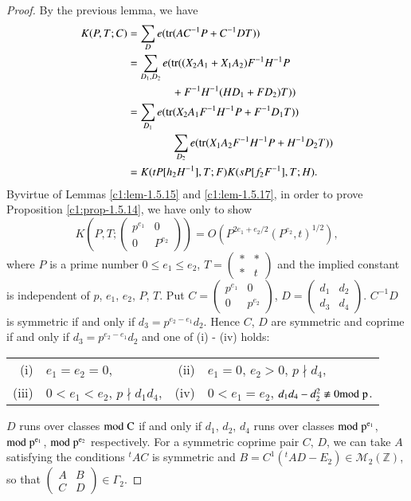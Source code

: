 \begin{proof}
By the previous lemma, we have
\begin{align*}
K(P,T;C)&= \sum_{D}e(\operatorname{tr}(AC^{-1}P+C^{-1}DT))\\
&=\sum_{D_{1},D_{2}}e(\operatorname{tr}((X_{2}A_{1}+X_{1}A_{2})F^{-1}H^{-1}P\\
&\qquad\qquad +F^{-1}H^{-1}(HD_{1}+FD_{2})T))\\
&=\sum_{D_{1}}e(\operatorname{tr}(X_{2}A_{1}F^{-1}H^{-1}P+F^{-1}D_{1}T))\\
&\qquad\qquad\sum_{D_{2}}e(\operatorname{tr}(X_{1}A_{2}F^{-1}H^{-1}P+H^{-1}D_{2}T))\\
&= K(tP[h_{2}H^{-1}], T;F)K(sP[f_{2}F^{-1}], T;H).
\end{align*}
By\pageoriginale virtue of Lemmas \ref{c1:lem-1.5.15} and
\ref{c1:lem-1.5.17}, in order to prove Proposition \ref{c1:prop-1.5.14}, we
have only to show
$$
K(P,T;
\begin{pmatrix}
p^{e_{1}} & 0\\
0 & P^{e_{2}}
\end{pmatrix}
)=O(P^{2e_{1}+e_{2}/2}(P^{e_{2}},t)^{1/2}),
$$
where $P$ is a prime number $0\leq e_{1}\leq e_{2}$,
$T=\left(\begin{smallmatrix} \ast & \ast\\ \ast & t
\end{smallmatrix}\right)$ and the implied constant is independent of
$p$, $e_{1}$, $e_{2}$, $P$, $T$. Put $C=\left(\begin{smallmatrix}
  p^{e_{1}} & 0\\ 0 & p^{e_{2}}
\end{smallmatrix}\right)$, $D=\left(\begin{smallmatrix} d_{1} &
  d_{2}\\ d_{3} & d_{4}\end{smallmatrix}\right)$. $C^{-1}D$ is
symmetric if and only if $d_{3}=p^{e_{2}-e_{1}}d_{2}$. Hence $C$, $D$
are symmetric and coprime if and only if $d_{3}=p^{e_{2}-e_{1}}d_{2}$
and one of (i) - (iv) holds:
\begin{center}
\begin{tabular}{r@{\;\,}lr@{\;\,}l}
(i) & $e_{1}=e_{2}=0$, & (ii) & $e_{1}=0$, $e_{2}>0$, $p\nmid
  d_{4}$,\\[4pt]
(iii) & $0<e_{1}<e_{2}$, $p\nmid d_{1}d_{4}$, & (iv) &
  $0<e_{1}=e_{2}$, $d_{1}d_{4}-d^{2}_{2}\not\equiv 0\rm{mod} \; p$.
\end{tabular}
\end{center}
$D$ runs over classes $\rm{mod} \; C$ if and only if $d_{1}$, $d_{2}$,
$d_{4}$ runs over classes $\rm{mod} \; p^{e_{1}}$, $\rm{mod} \; p^{e_{1}}$, $\rm{mod} \;
p^{e_{2}}$ respectively. For a symmetric coprime pair $C$, $D$, we can
take $A$ satisfying the conditions ${}^{t}AC$ is symmetric and
$B=C^{1}({}^{t}AD-E_{2})\in\mathscr{M}_{2}(\mathbb{Z})$, so that
$\left(\begin{smallmatrix} A & B\\ C & D
\end{smallmatrix}\right)\in\Gamma_{2}$.


\end{proof}
